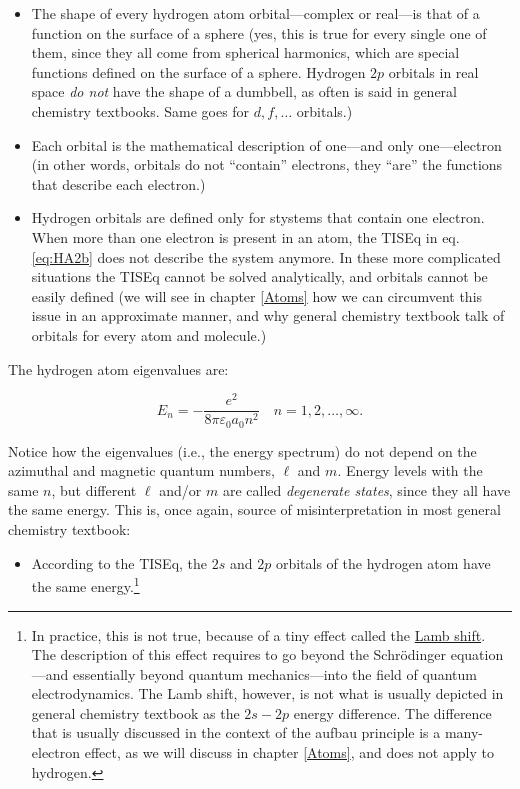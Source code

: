 \documentclass[
  9pt,
]{extbook}
\providecommand{\tightlist}{%
  \setlength{\itemsep}{0pt}\setlength{\parskip}{0pt}}
\theoremstyle{definition}
\theoremstyle{definition}
\theoremstyle{definition}
\theoremstyle{remark}
\begin{document}
\begin{itemize}
\tightlist
\item
  The shape of every hydrogen atom orbital---complex or real---is that of a function on the surface of a sphere (yes, this is true for every single one of them, since they all come from spherical harmonics, which are special functions defined on the surface of a sphere. Hydrogen \(2p\) orbitals in real space \emph{do not} have the shape of a dumbbell, as often is said in general chemistry textbooks. Same goes for \(d, f, \ldots\) orbitals.)
\item
  Each orbital is the mathematical description of one---and only one---electron (in other words, orbitals do not ``contain'' electrons, they ``are'' the functions that describe each electron.)
\item
  Hydrogen orbitals are defined only for stystems that contain one electron. When more than one electron is present in an atom, the TISEq in eq. \eqref{eq:HA2b} does not describe the system anymore. In these more complicated situations the TISEq cannot be solved analytically, and orbitals cannot be easily defined (we will see in chapter \ref{Atoms} how we can circumvent this issue in an approximate manner, and why general chemistry textbook talk of orbitals for every atom and molecule.)
\end{itemize}

The hydrogen atom eigenvalues are:

\begin{equation}
E_n = - \frac{e^2}{8 \pi \varepsilon_0 a_0 n^2} \quad n=1,2,\ldots,\infty.
\label{eq:HA7}
\end{equation}

Notice how the eigenvalues (i.e., the energy spectrum) do not depend on the azimuthal and magnetic quantum numbers, \(\ell\) and \(m\). Energy levels with the same \(n\), but different \(\ell\) and/or \(m\) are called \emph{degenerate states}, since they all have the same energy. This is, once again, source of misinterpretation in most general chemistry textbook:

\begin{itemize}
\tightlist
\item
  According to the TISEq, the \(2s\) and \(2p\) orbitals of the hydrogen atom have the same energy.\footnote{In practice, this is not true, because of a tiny effect called the \href{https://en.wikipedia.org/wiki/Lamb_shift}{Lamb shift}. The description of this effect requires to go beyond the Schrödinger equation---and essentially beyond quantum mechanics---into the field of quantum electrodynamics. The Lamb shift, however, is not what is usually depicted in general chemistry textbook as the \(2s-2p\) energy difference. The difference that is usually discussed in the context of the aufbau principle is a many-electron effect, as we will discuss in chapter \ref{Atoms}, and does not apply to hydrogen.}
\end{itemize}
\end{document}
